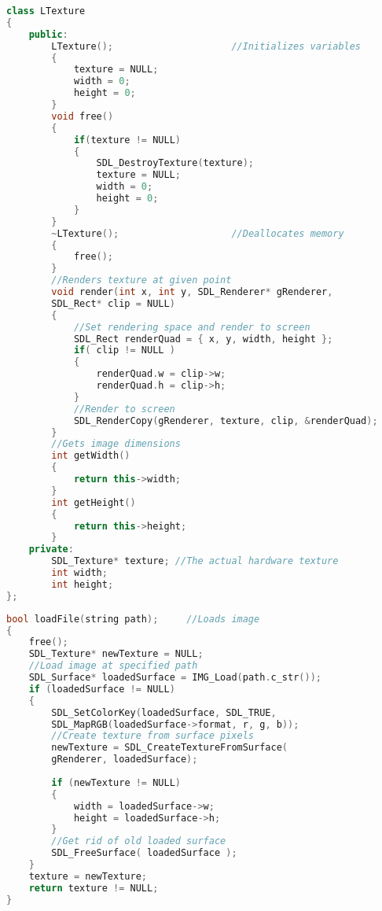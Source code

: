 \documentclass[11pt,fleqn]{book} %
\begin{document}

\begin{lstlisting}[language=C++, caption={Default, Overloaded and Copy Constructors}]
class LTexture
{
    public:
        LTexture();                     //Initializes variables
        {
            texture = NULL;
            width = 0;
            height = 0;
        }
        void free()
        {
            if(texture != NULL)
            {
                SDL_DestroyTexture(texture);
                texture = NULL;
                width = 0;
                height = 0;
            }
        }
        ~LTexture();                    //Deallocates memory
        {
            free();
        }
        //Renders texture at given point
        void render(int x, int y, SDL_Renderer* gRenderer,
        SDL_Rect* clip = NULL)
        {
            //Set rendering space and render to screen
            SDL_Rect renderQuad = { x, y, width, height };
            if( clip != NULL )
            {
                renderQuad.w = clip->w;
                renderQuad.h = clip->h;
            }
            //Render to screen
            SDL_RenderCopy(gRenderer, texture, clip, &renderQuad);
        }
        //Gets image dimensions
        int getWidth()
        {
            return this->width;
        }
        int getHeight()
        {
            return this->height;
        }
    private:
        SDL_Texture* texture; //The actual hardware texture
        int width;
        int height;
};
\end{lstlisting}

\begin{lstlisting}[language=C++, caption={Use of Array of Pointers and Destructors}]
bool loadFile(string path);     //Loads image
{
    free();
    SDL_Texture* newTexture = NULL;
    //Load image at specified path
    SDL_Surface* loadedSurface = IMG_Load(path.c_str());
    if (loadedSurface != NULL)
    {
        SDL_SetColorKey(loadedSurface, SDL_TRUE,
        SDL_MapRGB(loadedSurface->format, r, g, b));
        //Create texture from surface pixels
        newTexture = SDL_CreateTextureFromSurface( 
        gRenderer, loadedSurface);
        
        if (newTexture != NULL)
        {
            width = loadedSurface->w;
            height = loadedSurface->h;
        }
        //Get rid of old loaded surface
        SDL_FreeSurface( loadedSurface );
    }
    texture = newTexture;
    return texture != NULL;
}
\end{lstlisting}
\end{document}

